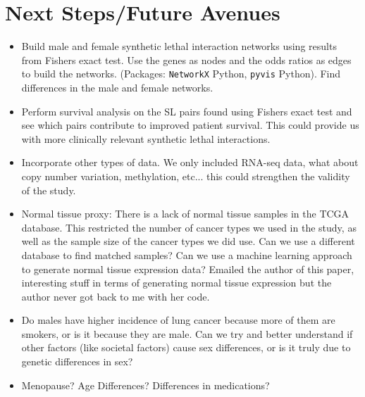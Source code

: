 \documentclass[10pt]{article}
\begin{document}
\section{Next Steps/Future Avenues}
\begin{itemize}
	\item Build male and female synthetic lethal interaction networks using results from Fishers exact test. Use the genes as nodes and the odds ratios as edges to build the networks. (Packages: \texttt{NetworkX} Python, \texttt{pyvis} Python). Find differences in the male and female networks.
	\item Perform survival analysis on the SL pairs found using Fishers exact test and see which pairs contribute to improved patient survival. This could provide us with more clinically relevant synthetic lethal interactions.
	\item Incorporate other types of data. We only included RNA-seq data, what about copy number variation, methylation, etc... this could strengthen the validity of the study.
	\item Normal tissue proxy: There is a lack of normal tissue samples in the TCGA database. This restricted the number of cancer types we used in the study, as well as the sample size of the cancer types we did use. Can we use a different database to find matched samples? Can we use a machine learning approach to generate normal tissue expression data? Emailed the author of this paper, interesting stuff in terms of generating normal tissue expression but the author never got back to me with her code. \citep{zeng2019selecting}
	\item Do males have higher incidence of lung cancer because more of them are smokers, or is it because they are male. Can we try and better understand if other factors (like societal factors) cause sex differences, or is it truly due to genetic differences in sex?
	\item Menopause? Age Differences? Differences in medications?
\end{itemize}


\end{document}
